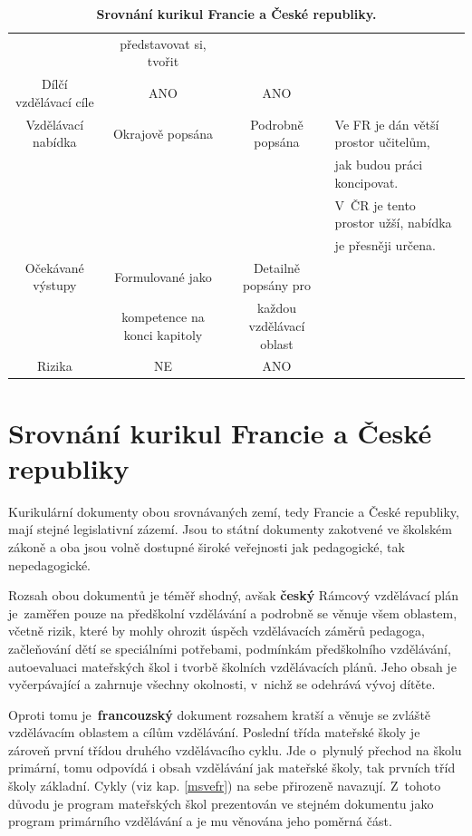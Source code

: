 \begin{landscape}
\begin{table}[t]
\begin{tabular}{|c|c|c|l|}
\rowcolor{grey!10}
					& představovat si, tvořit 	&						& 	\\		
\rowcolor{grey!50}
Dílčí vzdělávací cíle	& ANO					& ANO 					& 	\\	
\rowcolor{grey!10}
Vzdělávací nabídka	& Okrajově popsána	 		& Podrobně popsána	 	& Ve FR je dán větší prostor učitelům, 	\\
\rowcolor{grey!10}
					&							&						& jak budou práci koncipovat. 			\\
\rowcolor{grey!10}
					&							&						& V~ČR je tento prostor užší, nabídka 	\\
\rowcolor{grey!10}
					&							&						& je přesněji určena. 					\\
\rowcolor{grey!50}
Očekávané výstupy	& Formulované jako 				& Detailně popsány pro 		& 		\\ 
\rowcolor{grey!50}
					& kompetence na konci kapitoly 	& každou vzdělávací oblast 	& 		\\
\rowcolor{grey!10}
Rizika	 			& NE						& ANO	 						& 		\\
\hline
\end{tabular}
\caption{ \textbf{Srovnání kurikul Francie a České republiky.}
}
\label{tab:srovnaniKurikul}
\end{table}
\end{landscape}

\section{Srovnání kurikul Francie a České republiky}
\label{srovnanikurikulfrcr}

	Kurikulární dokumenty obou srovnávaných zemí, tedy Francie a České republiky, mají stejné legislativní zázemí. Jsou to státní dokumenty zakotvené ve školském zákoně a oba jsou volně dostupné široké veřejnosti jak pedagogické, tak nepedagogické. 

	Rozsah obou dokumentů je téměř shodný, avšak \textbf{český} Rámcový vzdělávací plán je zaměřen pouze na předškolní vzdělávání a podrobně se věnuje všem oblastem, včetně rizik, které by mohly ohrozit úspěch vzdělávacích záměrů pedagoga, začleňování dětí se speciálními potřebami, podmínkám předškolního vzdělávání, autoevaluaci mateřských škol i tvorbě školních vzdělávacích plánů. Jeho obsah je vyčerpávající a zahrnuje všechny okolnosti, v~nichž se odehrává vývoj dítěte. 

	Oproti tomu je \textbf{francouzský} dokument rozsahem kratší a věnuje se zvláště vzdělávacím oblastem a cílům vzdělávání. Poslední třída mateřské školy je zároveň první třídou druhého vzdělávacího cyklu. Jde o~plynulý přechod na školu primární, tomu odpovídá i obsah vzdělávání jak mateřské školy, tak prvních tříd školy základní. Cykly (viz kap. \ref{msvefr}) na sebe přirozeně navazují. Z~tohoto důvodu je program mateřských škol prezentován ve stejném dokumentu jako program primárního vzdělávání a je mu věnována jeho poměrná část.

